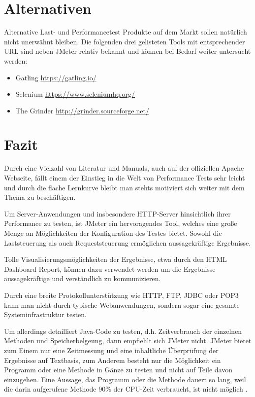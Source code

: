 \documentclass[a4paper,12pt]{article}
\begin{document}
\section{Alternativen}
Alternative  Last- und Performancetest Produkte auf dem Markt sollen natürlich nicht unerwähnt bleiben. Die folgenden drei gelisteten Tools mit entsprechender URL sind neben JMeter relativ bekannt und können bei Bedarf weiter untersucht werden: 
\begin{itemize}
	\item Gatling \url{https://gatling.io/}
	\item Selenium \url{https://www.seleniumhq.org/}
	\item The Grinder \url{http://grinder.sourceforge.net/}
\end{itemize}

\section{Fazit}
Durch eine Vielzahl von Literatur und Manuals, auch auf der offiziellen Apache Webseite, fällt einem der Einstieg in die Welt von Performance Tests sehr leicht und durch die flache Lernkurve bleibt man stehts motiviert sich weiter mit dem Thema zu beschäftigen.

Um Server-Anwendungen und insbesondere HTTP-Server hinsichtlich ihrer Performance zu testen, ist JMeter ein hervoragendes Tool, welches eine große Menge an Möglichkeiten der Konfiguration des Testes bietet. Sowohl die Laststeuerung als auch Requeststeuerung ermöglichen aussagekräftige Ergebnisse. 

Tolle Visualisierungsmöglichkeiten der Ergebnisse, etwa durch den HTML Dashboard Report, können dazu verwendet werden um die Ergebnisse aussagekräftige und verständlich zu kommunizieren.

Durch eine breite Protokollunterstützung wie HTTP, FTP, JDBC oder POP3 kann man nicht durch typische Webanwendungen, sondern sogar eine gesamte Systeminfrastruktur testen.

Um allerdings detailliert Java-Code zu testen, d.h. Zeitverbrauch der einzelnen Methoden und Speicherbelgeung, dann empfiehlt sich JMeter nicht. JMeter bietet zum Einem nur eine Zeitmessung und eine inhaltliche Überprüfung der Ergebnisse auf Textbasis, zum Anderem besteht nur die Möglichkeit ein Programm oder eine Methode in Gänze zu testen und nicht auf Teile davon einzugehen. Eine Aussage, das Programm oder die Methode dauert so lang, weil die darin aufgerufene Methode 90\% der CPU-Zeit verbraucht, ist nicht möglich \cite{online:performanceTools}.

\pagebreak
\thispagestyle{empty}


\end{document}
